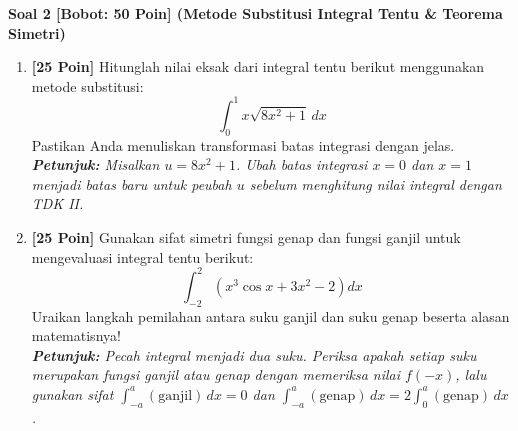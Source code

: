 \documentclass[11pt,a4paper]{article}
\begin{document}
\noindent\textbf{Soal 2 [Bobot: 50 Poin] (Metode Substitusi Integral Tentu \& Teorema Simetri)}
\begin{enumerate}[label=(\alph*), leftmargin=22pt]
    \item \textbf{[25 Poin]} Hitunglah nilai eksak dari integral tentu berikut menggunakan metode substitusi:
    \[
    \int_{0}^{1} x\sqrt{8x^2 + 1}\,dx
    \]
    Pastikan Anda menuliskan transformasi batas integrasi dengan jelas.\\
    \textit{\small\textbf{Petunjuk:} Misalkan $u = 8x^2 + 1$. Ubah batas integrasi $x = 0$ dan $x = 1$ menjadi batas baru untuk peubah $u$ sebelum menghitung nilai integral dengan TDK II.}
    
    \vspace{8pt}
    \item \textbf{[25 Poin]} Gunakan sifat simetri fungsi genap dan fungsi ganjil untuk mengevaluasi integral tentu berikut:
    \[
    \int_{-2}^{2} \left( x^3 \cos x + 3x^2 - 2 \right) dx
    \]
    Uraikan langkah pemilahan antara suku ganjil dan suku genap beserta alasan matematisnya!\\
  \textit{\small\textbf{Petunjuk:} Pecah integral menjadi dua suku. Periksa apakah setiap suku merupakan fungsi ganjil atau genap dengan memeriksa nilai $f(-x)$, lalu gunakan sifat $\int_{-a}^a (\text{ganjil})\,dx = 0$ dan $\int_{-a}^a (\text{genap})\,dx = 2\int_0^a (\text{genap})\,dx$.}
\end{enumerate}
\end{document}
